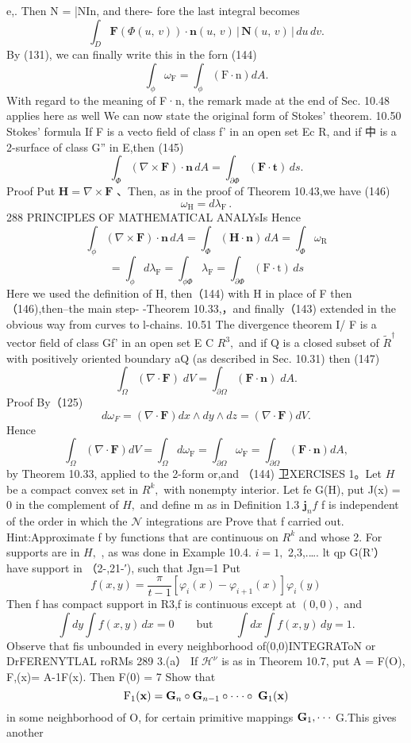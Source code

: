 e,. Then N = |NIn, and there- fore the last integral becomes $$ \int_{D}\mathbf{F}(\Phi(u,\,v))\cdot\mathbf{n}(u,\,v)\,|\,\mathbf{N}(u,\,v)\,|\,d u\,d v. $$ By (131), we can finally write this in the forn (144) $$ \int_{\phi}\omega_{\mathrm{F}}=\int_{\phi}\left(\mathrm{F}\cdot\mathrm{n}\right)d A. $$ With regard to the meaning of F·n, the remark made at the end of Sec. 10.48 applies here as well We can now state the original form of Stokes' theorem. 10.50 Stokes' formula If F is a vecto field of class f’ in an open set Ec R, and if 中 is a 2-surface of class G” in E,then (145) $$ \int_{\Phi}(\nabla\times\mathbf{F})\cdot\mathbf{n}\,d A=\int_{\partial\Phi}(\mathbf{F}\cdot\mathbf{t})\,d s. $$ Proof Put $\mathbf{H}=\nabla\times\mathbf{F}$ 、Then, as in the proof of Theorem 10.43,we have (146) $$ \omega_{\mathrm{H}}=d\lambda_{\mathrm{F}}\,. $$288 PRINCIPLES OF MATHEMATICAL ANALYsIs Hence $$ \int_{\phi}(\nabla\times\mathbf{F})\cdot\mathbf{n}\,d A=\int_{\Phi}(\mathbf{H}\cdot\mathbf{n})\,d A=\int_{\Phi}\omega_{\mathrm{{R}}} $$ $$ =\int_{\phi}d\lambda_{\mathrm{F}}=\int_{\phi\Phi}\lambda_{\mathrm{F}}=\int_{\partial\Phi}(\mathrm{F}\cdot\mathrm{t})\,d s $$ Here we used the definition of H, then（144) with H in place of F then （146),then--the main step- -Theorem 10.33,，and finally（143) extended in the obvious way from curves to l-chains. 10.51 The divergence theorem I/ F is a vector field of class Gf’ in an open set E C $R^{3},$ and if Q is a closed subset of ${\widetilde{R}}^{\dagger}$ with positively oriented boundary aQ (as described in Sec. 10.31) then (147) $$ \int_{\Omega}(\nabla\cdot\mathbf{F})\;d V=\int_{\partial\Omega}(\mathbf{F}\cdot\mathbf{n})\;d A. $$ Proof By（125) $$ d\omega_{F}=\left(\nabla\cdot\mathbf{F}\right)d x\wedge d y\wedge d z=\left(\nabla\cdot\mathbf{F}\right)d V. $$ Hence $$ \int_{\Omega}\left(\nabla\cdot\mathbf{F}\right)d V=\int_{\Omega}d\omega_{\mathrm{F}}=\int_{\partial\Omega}\omega_{\mathrm{F}}=\int_{\partial\Omega}\left(\mathbf{F}\cdot\mathbf{n}\right)d A, $$ by Theorem 10.33, applied to the 2-form or,and （144) 卫XERCISES 1。Let $\textstyle{H}$ be a compact convex set in $\textstyle R^{k},$ with nonempty interior. Let fe G(H), put J(x) = 0 in the complement of $\textstyle H,$ and define m as in Definition 1.3 $\mathbf{j}_{n}f$ f is independent of the order in which the ${\mathcal{N}}$ integrations are Prove that f carried out. Hint:Approximate f by functions that are continuous on $R^{k}$ and whose 2. For supports are in $\textstyle H,$ , as was done in Example 10.4. $i=1,$ 2,3,.…. lt qp G(R'） have support in （2-,21-′), such that Jgn=1 Put $$ f(x,y)=\textstyle{\frac{\pi}{t-1}}[\varphi_{i}(x)-\varphi_{i+1}(x)]\varphi_{i}(y) $$ Then f has compact support in R3,f is continuous except at $(0,0),$ and $$ \int\!d y\int\!f(x,y)\,d x=0\qquad\mathrm{but}\qquad\int\!d x\int\!f(x,y)\,d y=1. $$ Observe that fis unbounded in every neighborhood of(0,0)INTEGRAToN or DrFERENYTLAL roRMs 289 3.(a） If ${\mathcal{H}}^{\nu}$ is as in Theorem 10.7, put A = F(O), F,(x)= A-1F(x). Then F(0) = 7 Show that $$ \mathrm{F}_{1}({\bf x})={\bf G}_{n}\circ{\bf G}_{n-1}\circ\cdot\cdot\cdot\circ\;{\bf G}_{1}({\bf x}) $$ in some neighborhood of O, for certain primitive mappings ${\bf G}_{1},{\bf\cdot}\cdot{\bf\cdot}$ G.This gives another 